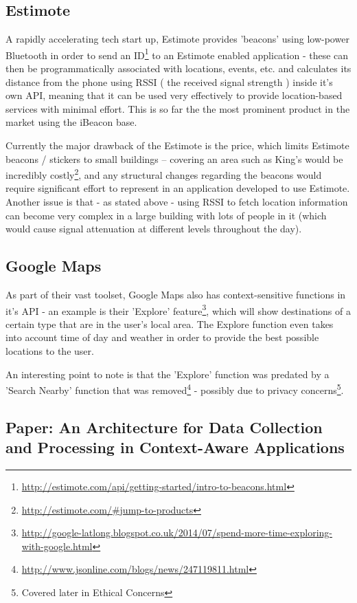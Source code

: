 \documentclass[11pt]{informatics-report}
\begin{document}
\subsection{Estimote}

A rapidly accelerating tech start up, Estimote provides 'beacons' using low-power Bluetooth in order to send an ID\footnote{\url{http://estimote.com/api/getting-started/intro-to-beacons.html}} to an Estimote enabled application - these can then be programmatically associated with locations, events, etc. and calculates its distance from the phone using RSSI ( the received signal strength ) inside it's own API, meaning that it can be used very effectively to provide location-based services with minimal effort. This is so far the the most prominent product in the market using the iBeacon base.

Currently the major drawback of the Estimote is the price, which limits Estimote beacons / stickers to small buildings – covering an area such as King’s would be incredibly costly\footnote{\url{http://estimote.com/\#jump-to-products}}, and any structural changes regarding the beacons would require significant effort to represent in an application developed to use Estimote. Another issue is that - as stated above - using RSSI to fetch location information can become very complex in a large building with lots of people in it (which would cause signal attenuation at different levels throughout the day). 

\subsection{Google Maps}

As part of their vast toolset, Google Maps also has context-sensitive functions in it's API - an example is their 'Explore' feature\footnote{\url{http://google-latlong.blogspot.co.uk/2014/07/spend-more-time-exploring-with-google.html}}, which will show destinations of a certain type that are in the user's local area. The Explore function even takes into account time of day and weather in order to provide the best possible locations to the user.

An interesting point to note is that the 'Explore' function was predated by a 'Search Nearby' function that was removed\footnote{\url{http://www.jsonline.com/blogs/news/247119811.html}} - possibly due to privacy concerns\footnote{Covered later in Ethical Concerns}.


\subsection{Paper: An Architecture for Data Collection and Processing in Context-Aware Applications}\cite{salviarchitecture}
\end{document}
